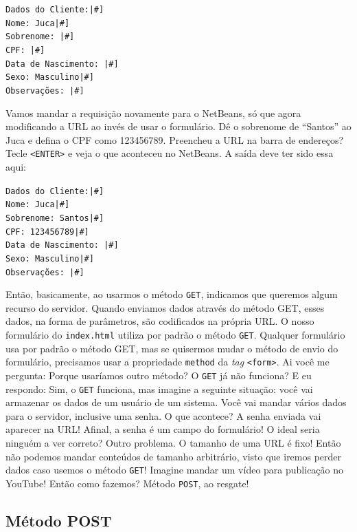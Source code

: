 \texttt{Dados do Cliente:|\#]}\\
\texttt{Nome: Juca|\#]}\\
\texttt{Sobrenome: |\#]}\\
\texttt{CPF: |\#]}\\
\texttt{Data de Nascimento: |\#]}\\
\texttt{Sexo: Masculino|\#]}\\
\texttt{Observações: |\#]}

Vamos mandar a requisição novamente para o NetBeans, só que agora modificando a URL ao invés de usar o formulário. Dê o sobrenome de ``Santos'' ao Juca e defina o CPF como 123456789. Preencheu a URL na barra de endereços? Tecle \texttt{<ENTER>} e veja o que aconteceu no NetBeans. A saída deve ter sido essa aqui:

\texttt{Dados do Cliente:|\#]}\\
\texttt{Nome: Juca|\#]}\\
\texttt{Sobrenome: Santos|\#]}\\
\texttt{CPF: 123456789|\#]}\\
\texttt{Data de Nascimento: |\#]}\\
\texttt{Sexo: Masculino|\#]}\\
\texttt{Observações: |\#]}

Então, basicamente, ao usarmos o método \texttt{GET}, indicamos que queremos algum recurso do servidor. Quando enviamos dados através do método GET, esses dados, na forma de parâmetros, são codificados na própria URL. O nosso formulário do \texttt{index.html} utiliza por padrão o método \texttt{GET}. Qualquer formulário usa por padrão o método GET, mas se quisermos mudar o método de envio do formulário, precisamos usar a propriedade \texttt{method} da \textit{tag} \texttt{<form>}. Ai você me pergunta: Porque usaríamos outro método? O \texttt{GET} já não funciona? E eu respondo: Sim, o \texttt{GET} funciona, mas imagine a seguinte situação: você vai armazenar os dados de um usuário de um sistema. Você vai mandar vários dados para o servidor, inclusive uma senha. O que acontece? A senha enviada vai aparecer na URL! Afinal, a senha é um campo do formulário! O ideal seria ninguém a ver correto? Outro problema. O tamanho de uma URL é fixo! Então não podemos mandar conteúdos de tamanho arbitrário, visto que iremos perder dados caso usemos o método \texttt{GET}! Imagine mandar um vídeo para publicação no YouTube! Então como fazemos? Método \texttt{POST}, ao resgate!


\subsection{Método POST}

